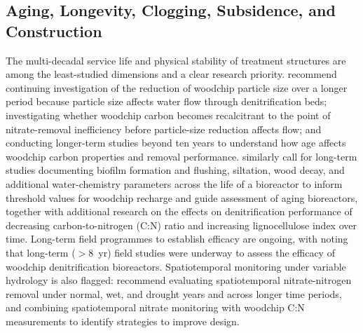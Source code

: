 \subsection{Aging, Longevity, Clogging, Subsidence, and Construction}
The multi-decadal service life and physical stability of treatment structures are among the least-studied dimensions and a clear research priority. \textcite{Ghane2018} recommend continuing investigation of the reduction of woodchip particle size over a longer period because particle size affects water flow through denitrification beds; investigating whether woodchip carbon becomes recalcitrant to the point of nitrate-removal inefficiency before particle-size reduction affects flow; and conducting longer-term studies beyond ten years to understand how age affects woodchip carbon properties and removal performance. \textcite{Christianson2020} similarly call for long-term studies documenting biofilm formation and flushing, siltation, wood decay, and additional water-chemistry parameters across the life of a bioreactor to inform threshold values for woodchip recharge and guide assessment of aging bioreactors, together with additional research on the effects on denitrification performance of decreasing carbon-to-nitrogen (C:N) ratio and increasing lignocellulose index over time. Long-term field programmes to establish efficacy are ongoing, with \textcite{Greenan2009} noting that long-term ($>$8~yr) field studies were underway to assess the efficacy of woodchip denitrification bioreactors. Spatiotemporal monitoring under variable hydrology is also flagged: \textcite{Hartfiel2023b} recommend evaluating spatiotemporal nitrate-nitrogen removal under normal, wet, and drought years and across longer time periods, and combining spatiotemporal nitrate monitoring with woodchip C:N measurements to identify strategies to improve design.

